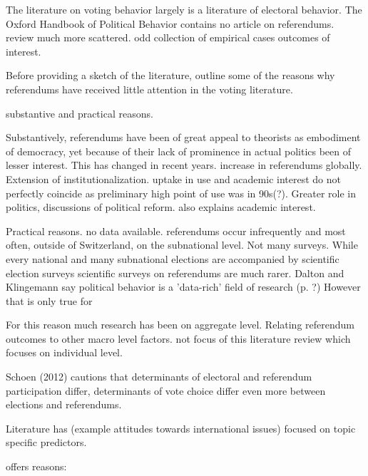 \documentclass[11pt,a4paper]{article}\usepackage[]{graphicx}\usepackage[]{color}
\begin{document}
	The literature on voting behavior largely is a literature of electoral behavior. The Oxford Handbook of Political Behavior contains no article on referendums. review much more scattered. odd collection of empirical cases outcomes of interest.
	
	Before providing a sketch of the literature, outline some of the reasons why referendums have received little attention in the voting literature. 
	
	substantive and practical reasons.
	
	Substantively, referendums have been of great appeal to theorists as embodiment of democracy, yet because of their lack of prominence in actual politics been of lesser interest. This has changed in recent years. increase in referendums globally. Extension of institutionalization. uptake in use and academic interest do not perfectly coincide as preliminary high point of use was in 90s(?). Greater role in politics, discussions of political reform. also explains academic interest.
		
Practical reasons. no data available. referendums occur infrequently and most often, outside of Switzerland, on the subnational level. Not many surveys. While every national and many subnational elections are accompanied by scientific election surveys scientific surveys on referendums are much rarer. Dalton and Klingemann say political behavior is a 'data-rich' field  of research (p. ?) However that is only true for 
	
	For this reason much research has been on aggregate level. Relating referendum outcomes to other macro level factors. not focus of this literature review which focuses on individual level.
	
	Schoen (2012) cautions that determinants of electoral and referendum participation differ, determinants of vote choice differ even more between elections and referendums. 
	
	Literature has (example attitudes towards international issues) focused on topic specific predictors.
	
	offers reasons:
	
\end{document}
